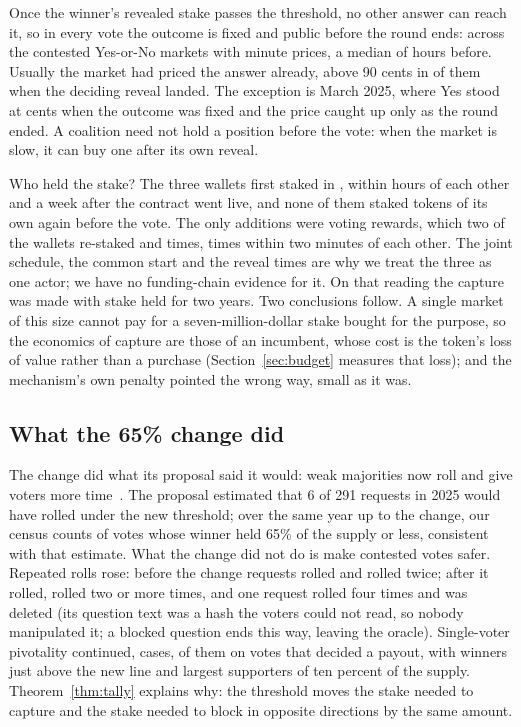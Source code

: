 \documentclass[conference,compsoc]{IEEEtran}
\begin{document}
Once the winner's revealed stake passes the threshold, no other answer can reach it, so in every vote the outcome is fixed and public before the round ends: across the \leakMarkets{} contested Yes-or-No markets with minute prices, a median of \leakLeadMedianH{} hours before. Usually the market had priced the answer already, above 90 cents in \leakHigh{} of them when the deciding reveal landed. The exception is March 2025, where Yes stood at \leakMarchCents{} cents when the outcome was fixed and the price caught up only as the round ended. A coalition need not hold a position before the vote: when the market is slow, it can buy one after its own reveal.

Who held the stake? The three wallets first staked in \whaleFirstStakeDate, within \whaleFirstStakeHours{} hours of each other and a week after the contract went live, and none of them staked tokens of its own again before the vote. The only additions were voting rewards, which two of the wallets re-staked \whaleRestakesA{} and \whaleRestakesB{} times, \whaleRestakesPaired{} times within two minutes of each other. The joint schedule, the common start and the reveal times are why we treat the three as one actor; we have no funding-chain evidence for it. On that reading the capture was made with stake held for two years. Two conclusions follow. A single market of this size cannot pay for a seven-million-dollar stake bought for the purpose, so the economics of capture are those of an incumbent, whose cost is the token's loss of value rather than a purchase (Section~\ref{sec:budget} measures that loss); and the mechanism's own penalty pointed the wrong way, small as it was.

\subsection{What the 65\% change did}
\label{sec:change}
 The change did what its proposal said it would: weak majorities now roll and give voters more time~\cite{umaspat2025}. The proposal estimated that 6 of 291 requests in 2025 would have rolled under the new threshold; over the same year up to the change, our census counts \nTwentyTwentyFiveUnderSixtyFive{} of \nTwentyTwentyFiveBeforeChange{} votes whose winner held 65\% of the supply or less, consistent with that estimate. What the change did not do is make contested votes safer. Repeated rolls rose: before the change \nRolledEraA{} requests rolled and \nRepeatRollsEraA{} rolled twice; after it \nRolledEraB{} rolled, \nRepeatRollsEraB{} rolled two or more times, and one request rolled four times and was deleted (its question text was a hash the voters could not read, so nobody manipulated it; a blocked question ends this way, leaving the oracle). Single-voter pivotality continued, \nPivotalEraB{} cases, \nPayoutPivotalEraB{} of them on votes that decided a payout, with winners just above the new line and largest supporters of ten percent of the supply. Theorem~\ref{thm:tally} explains why: the threshold moves the stake needed to capture and the stake needed to block in opposite directions by the same amount.
\end{document}

